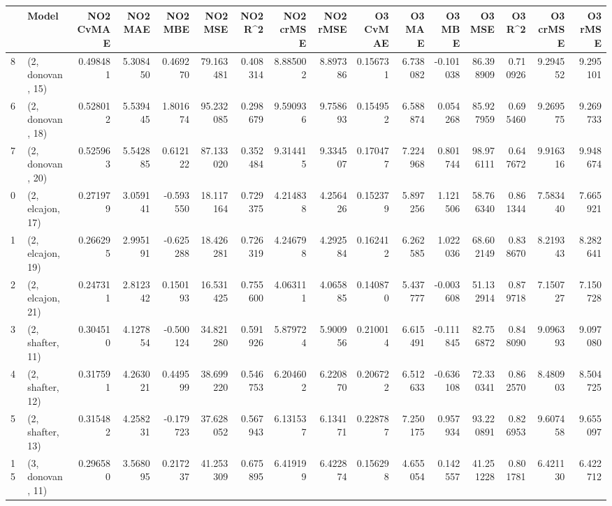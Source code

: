 \begin{tabular}{llrrrrrrrrrrrrrr}
\toprule
{} &             Model &  NO2 CvMAE &   NO2 MAE &   NO2 MBE &    NO2 MSE &   NO2 R\textasciicircum2 &  NO2 crMSE &  NO2 rMSE &  O3 CvMAE &    O3 MAE &    O3 MBE &      O3 MSE &    O3 R\textasciicircum2 &   O3 crMSE &    O3 rMSE \\
\midrule
8  &  (2, donovan, 15) &   0.498481 &  5.308450 &  0.469270 &  79.163481 &  0.408314 &   8.885002 &  8.897386 &  0.156731 &  6.738082 & -0.101038 &   86.398909 &  0.710926 &   9.294552 &   9.295101 \\
6  &  (2, donovan, 18) &   0.528012 &  5.539445 &  1.801674 &  95.232085 &  0.298679 &   9.590936 &  9.758693 &  0.154952 &  6.588874 &  0.054268 &   85.927959 &  0.695460 &   9.269575 &   9.269733 \\
7  &  (2, donovan, 20) &   0.525963 &  5.542885 &  0.612122 &  87.133020 &  0.352484 &   9.314415 &  9.334507 &  0.170477 &  7.224968 &  0.801744 &   98.976111 &  0.647672 &   9.916316 &   9.948674 \\
0  &  (2, elcajon, 17) &   0.271979 &  3.059141 & -0.593550 &  18.117164 &  0.729375 &   4.214838 &  4.256426 &  0.152379 &  5.897256 &  1.121506 &   58.766340 &  0.861344 &   7.583440 &   7.665921 \\
1  &  (2, elcajon, 19) &   0.266295 &  2.995191 & -0.625288 &  18.426281 &  0.726319 &   4.246798 &  4.292584 &  0.162412 &  6.262585 &  1.022036 &   68.602149 &  0.838670 &   8.219343 &   8.282641 \\
2  &  (2, elcajon, 21) &   0.247311 &  2.812342 &  0.150193 &  16.531425 &  0.755600 &   4.063111 &  4.065885 &  0.140870 &  5.437777 & -0.003608 &   51.132914 &  0.879718 &   7.150727 &   7.150728 \\
3  &  (2, shafter, 11) &   0.304510 &  4.127854 & -0.500124 &  34.821280 &  0.591926 &   5.879724 &  5.900956 &  0.210014 &  6.615491 & -0.111845 &   82.756872 &  0.848090 &   9.096393 &   9.097080 \\
4  &  (2, shafter, 12) &   0.317591 &  4.263021 &  0.449599 &  38.699220 &  0.546753 &   6.204602 &  6.220870 &  0.206722 &  6.512633 & -0.636108 &   72.330341 &  0.862570 &   8.480903 &   8.504725 \\
5  &  (2, shafter, 13) &   0.315482 &  4.258231 & -0.179723 &  37.628052 &  0.567943 &   6.131537 &  6.134171 &  0.228787 &  7.250175 &  0.957934 &   93.220891 &  0.826953 &   9.607458 &   9.655097 \\
15 &  (3, donovan, 11) &   0.296580 &  3.568095 &  0.217237 &  41.253309 &  0.675895 &   6.419199 &  6.422874 &  0.156298 &  4.655054 &  0.142557 &   41.251228 &  0.801781 &   6.421130 &   6.422712 \\

\end{tabular}
